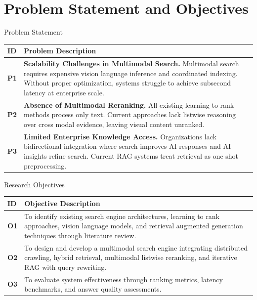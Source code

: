 \documentclass[aspectratio=169,xcolor=dvipsnames]{beamer}
\begin{document}
\section{Problem Statement and Objectives}

\begin{frame}{Problem Statement}
    \small
    \begin{table}
        \centering
        \renewcommand{\arraystretch}{1.4}
        \begin{tabular}{p{}|p{}}
        \toprule
        \textbf{ID} & \textbf{Problem Description} \\
        \midrule
        \textbf{P1} & \textbf{Scalability Challenges in Multimodal Search.} Multimodal search requires expensive vision language inference and coordinated indexing. Without proper optimization, systems struggle to achieve subsecond latency at enterprise scale. \\
        \midrule
        \textbf{P2} & \textbf{Absence of Multimodal Reranking.} All existing learning to rank methods process only text. Current approaches lack listwise reasoning over cross modal evidence, leaving visual content unranked. \\
        \midrule
        \textbf{P3} & \textbf{Limited Enterprise Knowledge Access.} Organizations lack bidirectional integration where search improves AI responses and AI insights refine search. Current RAG systems treat retrieval as one shot preprocessing. \\
        \bottomrule
        \end{tabular}
    \end{table}
\end{frame}

\begin{frame}{Research Objectives}
    \begin{table}
        \centering
        \renewcommand{\arraystretch}{1.6}
        \begin{tabular}{p{}|p{}}
        \toprule
        \textbf{ID} & \textbf{Objective Description} \\
        \midrule
        \textbf{O1} & To identify existing search engine architectures, learning to rank approaches, vision language models, and retrieval augmented generation techniques through literature review. \\
        \midrule
        \textbf{O2} & To design and develop a multimodal search engine integrating distributed crawling, hybrid retrieval, multimodal listwise reranking, and iterative RAG with query rewriting. \\
        \midrule
        \textbf{O3} & To evaluate system effectiveness through ranking metrics, latency benchmarks, and answer quality assessments. \\
        \bottomrule
        \end{tabular}
    \end{table}
\end{frame}
\end{document}
